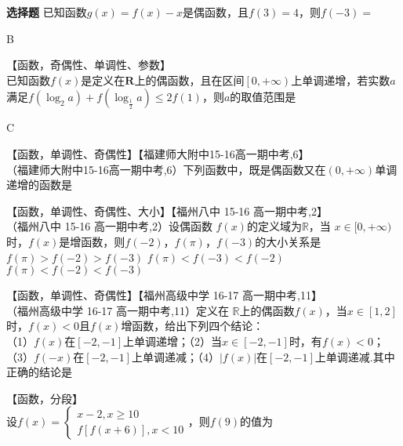 \begin{exercise}{\bf 选择题}
      已知函数$g(x)=f(x)-x$是偶函数，且$ f(3)=4 $，则$ f(-3)= $\xz
      \begin{answer}
        B
      \end{answer}
    \item 【函数，奇偶性、单调性、参数】\\
      已知函数$f(x)$是定义在$ \mathbf{R} $上的偶函数，且在区间$ \left[0,+\infty\right) $上单调递增，若实数$ a $满足$ f(\log_2a) +f(\log_\frac{1}{2}a)\le 2f(1)$，则$ a $的取值范围是\xz
      \xx{$ \left[1,2\right]$}{$ \left(0,\dfrac{1}{2}\right]$}{$ \left[\dfrac{1}{2},2\right]$}{$ \left(0,2\right]$}
      \begin{answer}
        C
      \end{answer}
    \item 【函数，单调性、奇偶性】【福建师大附中15-16高一期中考,6】\\
      （福建师大附中15-16高一期中考,6）下列函数中，既是偶函数又在$(0,+\infty)$单调递增的函数是\xz
    \item 【函数，单调性、奇偶性、大小】【福州八中 15-16 高一期中考,2】\\
      （福州八中 15-16 高一期中考,2）设偶函数 $f(x)$的定义域为$\mathbb{R}$，当 $x\in[0,+\infty)$时，$f(x)$是增函数，则$f(-2)$，$f(\pi)$，$f(-3)$的大小关系是\xz
          {$f(\pi)>f(-2)>f(-3)$}
          {$f(\pi)<f(-3)<f(-2)$}
          {$f(\pi)<f(-2)<f(-3)$}
    \item 【函数，单调性、奇偶性】【福州高级中学 16-17 高一期中考,11】\\
      （福州高级中学 16-17 高一期中考,11）定义在 $\mathbb{R}$上的偶函数$f(x)$，当$x\in[1,2]$时，$f(x)<0$且$f(x)$增函数，给出下列四个结论：\\
      （1）$f(x)$在$[-2,-1]$上单调递增；\hspace{4em}（2）当$x\in[-2,-1]$时，有$f(x)<0$；\\
      （3）$f(-x)$在$[-2,-1]$上单调递减；\hspace{4em}（4）$|f(x)|$在$[-2,-1]$上单调递减.其中正确的结论是\xz
    \item 【函数，分段】\\
      设$f(x)=\begin{cases}
        x-2,x\geq10\\f[f(x+6)],x<10
      \end{cases}$，则$f(9)$的值为\xz
      \begin{answer}

\end{answer}
\end{exercise}
